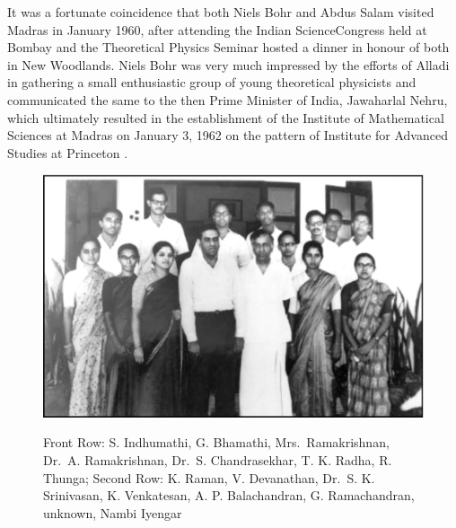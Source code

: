 It was a fortunate coincidence that both Niels Bohr and Abdus Salam visited Madras in January 1960, after attending the Indian Science\break Congress held at Bombay and the Theoretical Physics Seminar hosted a dinner in honour of both in New Woodlands. Niels Bohr was very much impressed by the efforts of Alladi in gathering a small enthusiastic group of young theoretical physicists and communicated the same to the then Prime Minister of India, Jawaharlal Nehru, which ultimately resulted in the establishment of the Institute of Mathematical Sciences at Madras 	on January 3, 1962 on the pattern of Institute for Advanced Studies at Princeton \cite{chap3-key9}.
\medskip



\begin{figure}[t]
\centering
\includegraphics[scale=.35]{src/images/chap3/chap3-fig3.eps}\\
\caption{Front Row: S. Indhumathi, G. Bhamathi, Mrs.\ Ramakrishnan, Dr.\ A. Ramakrishnan, Dr.\ S. Chandrasekhar, T. K. Radha, R. Thunga;
Second Row: K. Raman, V. Devanathan, Dr.\ S. K. Srinivasan, K. Venkatesan, A. P. Balachandran, G. Ramachandran, unknown, Nambi Iyengar}
\end{figure}

